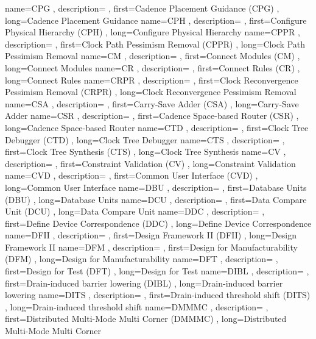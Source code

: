 { name={CPG}
, description={}
, first={Cadence Placement Guidance (CPG)}
, long={Cadence Placement Guidance}
}
{ name={CPH}
, description={}
, first={Configure Physical Hierarchy (CPH)}
, long={Configure Physical Hierarchy}
}
{ name={CPPR}
, description={}
, first={Clock Path Pessimism Removal (CPPR)}
, long={Clock Path Pessimism Removal}
}
{ name={CM}
, description={}
, first={Connect Modules (CM)}
, long={Connect Modules}
}
{ name={CR}
, description={}
, first={Connect Rules (CR)}
, long={Connect Rules}
}
{ name={CRPR}
, description={}
, first={Clock Reconvergence Pessimism Removal (CRPR)}
, long={Clock Reconvergence Pessimism Removal}
}
{ name={CSA}
, description={}
, first={Carry-Save Adder (CSA)}
, long={Carry-Save Adder}
}
{ name={CSR}
, description={}
, first={Cadence Space-based Router (CSR)}
, long={Cadence Space-based Router}
}
{ name={CTD}
, description={}
, first={Clock Tree Debugger (CTD)}
, long={Clock Tree Debugger}
}
{ name={CTS}
, description={}
, first={Clock Tree Synthesis (CTS)}
, long={Clock Tree Synthesis}
}
{ name={CV}
, description={}
, first={Constraint Validation (CV)}
, long={Constraint Validation}
}
{ name={CVD}
, description={}
, first={Common User Interface (CVD)}
, long={Common User Interface}
}
{ name={DBU}
, description={}
, first={Database Units (DBU)}
, long={Database Units}
}
{ name={DCU}
, description={}
, first={Data Compare Unit (DCU)}
, long={Data Compare Unit}
}
{ name={DDC}
, description={}
, first={Define Device Correspondence (DDC)}
, long={Define Device Correspondence}
}
{ name={DFII}
, description={}
, first={Design Framework II (DFII)}
, long={Design Framework II}
}
{ name={DFM}
, description={}
, first={Design for Manufacturability (DFM)}
, long={Design for Manufacturability}
}
{ name={DFT}
, description={}
, first={Design for Test (DFT)}
, long={Design for Test}
}
{ name={DIBL}
, description={}
, first={Drain-induced barrier lowering (DIBL)}
, long={Drain-induced barrier lowering}
}
{ name={DITS}
, description={}
, first={Drain-induced threshold shift (DITS)}
, long={Drain-induced threshold shift}
}
{ name={DMMMC}
, description={}
, first={Distributed Multi-Mode Multi Corner (DMMMC)}
, long={Distributed Multi-Mode Multi Corner}
}
